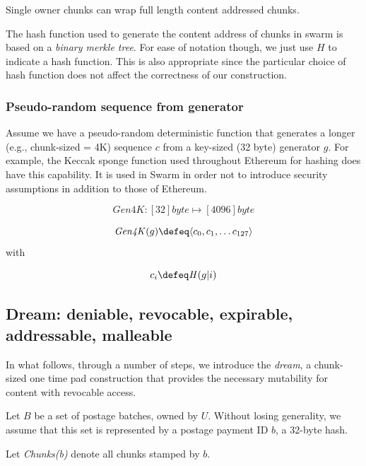 Single owner chunks can wrap full length  content addressed chunks.

The hash function used to generate the content address of chunks in swarm is based on a \emph{binary merkle tree}. For ease of notation though, we just use $\mathit{H}$ to indicate a hash function. This is also appropriate since the particular choice of hash function does not affect the correctness   of our construction.  


\subsubsection{Pseudo-random sequence from generator}
Assume we have a pseudo-random deterministic function that generates a longer (e.g., chunk-sized = 4K) sequence $c$ from a key-sized (32 byte) generator $g$. For example, the Keccak sponge function used throughout Ethereum for hashing does have this capability. It is used in Swarm in order not to introduce  security assumptions in addition to those of Ethereum.

\begin{definition}
\label{def:gen4k}
\begin{equation}
\mathit{Gen4K}: [32]byte \mapsto [4096]byte
\end{equation}

\begin{equation}
\mathit{Gen4K}(g) \defeq \langle c_0, c_1, \ldots c_{127}\rangle
\end{equation}
with 

\begin{equation}
c_i \defeq \mathit{H}(g|i)
\end{equation}
\end{definition}


\subsection{Dream: deniable, revocable, expirable, addressable, malleable}

In what follows, through a number of steps, we introduce the \emph{dream}, a chunk-sized one time pad construction that provides the necessary mutability for content with revocable access.

Let $B$ be a set  of postage batches, owned by $U$. Without losing generality, we assume that this set is represented by a postage payment ID $b$, a 32-byte hash. 

Let \emph{Chunks(b)} denote all chunks stamped by $b$.


